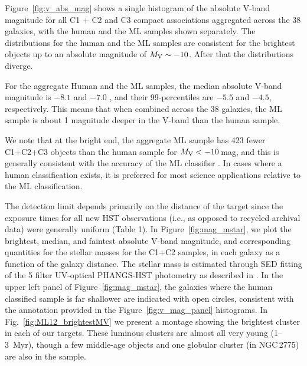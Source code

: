 \documentclass[linenumbers]{aastex63}
\begin{document}
{Figure~\ref{fig:v_abs_mag} shows a single histogram of the absolute V-band magnitude for all C1 + C2 and C3 compact associations aggregated across the 38 galaxies, with the human and the ML samples shown separately.  The distributions for the human and the ML samples are consistent for the brightest objects up to an absolute magnitude of $M_{\rm V} \sim -10$. After that the distributions diverge.

For the aggregate Human and the ML samples, the median absolute V-band magnitude is $-8.1$ and $-7.0$ , and their 99-percentiles are $-5.5$ and $-4.5$, respectively. This means that when combined across the 38 galaxies, the ML sample is about 1 magnitude deeper in the V-band than the human sample.

We note that at the bright end, the aggregate ML sample has 423 fewer C1+C2+C3 objects than the human sample for $M_{\rm V} < -10$\,mag, and this is generally consistent with the accuracy of the ML classifier \citep{hannon_star_2023}.  In cases where a human classification exists, it is preferred for most science applications relative to the ML classification.


The detection limit depends primarily on the distance of the target since the exposure times for all new HST observations (i.e., as opposed to recycled archival data) were generally uniform (Table 1).  In Figure~\ref{fig:mag_mstar}, we plot the brightest, median, and faintest absolute V-band magnitude, and corresponding quantities for the stellar masses for the C1+C2 samples, in each galaxy as a function of the galaxy distance. The stellar mass is estimated through SED fitting of the 5 filter UV-optical PHANGS-HST photometry as described in \citet{thilker23sed}.
In the upper left panel of Figure~\ref{fig:mag_mstar}, the galaxies where the human classified sample is far shallower are indicated with open circles, consistent with the annotation provided in the Figure~\ref{fig:v_mag_panel} histograms. In Fig.~\ref{fig:ML12_brightestMV} we present a montage showing the brightest cluster in each of our targets.  These luminous clusters are almost all very young (1--3~Myr), though a few middle-age objects and one globular cluster (in NGC\,2775) are also in the sample.

}
\end{document}
